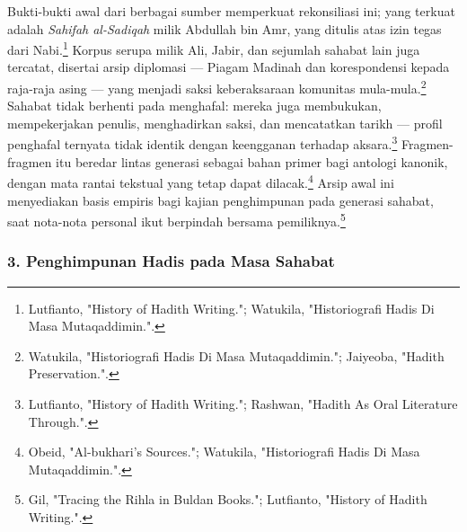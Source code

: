 Bukti-bukti awal dari berbagai sumber memperkuat rekonsiliasi ini; yang terkuat adalah \textit{Sahifah al-Sadiqah} milik Abdullah bin Amr, yang ditulis atas izin tegas dari Nabi.\footnote{Lutfianto, "History of Hadith Writing."; Watukila, "Historiografi Hadis Di Masa Mutaqaddimin.".} Korpus serupa milik Ali, Jabir, dan sejumlah sahabat lain juga tercatat, disertai arsip diplomasi --- Piagam Madinah dan korespondensi kepada raja-raja asing --- yang menjadi saksi keberaksaraan komunitas mula-mula.\footnote{Watukila, "Historiografi Hadis Di Masa Mutaqaddimin."; Jaiyeoba, "Hadith Preservation.".} Sahabat tidak berhenti pada menghafal: mereka juga membukukan, mempekerjakan penulis, menghadirkan saksi, dan mencatatkan tarikh --- profil penghafal ternyata tidak identik dengan keengganan terhadap aksara.\footnote{Lutfianto, "History of Hadith Writing."; Rashwan, "Hadith As Oral Literature Through.".} Fragmen-fragmen itu beredar lintas generasi sebagai bahan primer bagi antologi kanonik, dengan mata rantai tekstual yang tetap dapat dilacak.\footnote{Obeid, "Al-bukhari's Sources."; Watukila, "Historiografi Hadis Di Masa Mutaqaddimin.".} Arsip awal ini menyediakan basis empiris bagi kajian penghimpunan pada generasi sahabat, saat nota-nota personal ikut berpindah bersama pemiliknya.\footnote{Gil, "Tracing the Rihla in Buldan Books."; Lutfianto, "History of Hadith Writing.".}

\subsubsection*{3. Penghimpunan Hadis pada Masa Sahabat}

